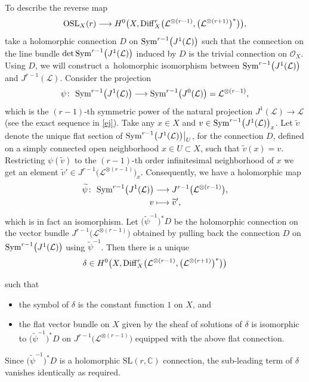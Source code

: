 \documentclass[pdftex]{sigma}
\numberwithin{equation}{section}
\begin{document}
To describe the reverse map
\begin{equation}\label{z1b}
{\rm OSL}_X(r) \longrightarrow H^0\bigl(X, {\rm Diff}^r_X
\bigl({\mathcal L}^{\otimes (r-1)}, \bigl({\mathcal L}^{\otimes (r+1)}\bigr)^*\bigr)\bigr),
\end{equation}
take a holomorphic connection $D$ on ${\rm Sym}^{r-1}\bigl(J^1(\mathcal
L)\bigr)$ such that the connection on the line bundle $\det {\rm Sym}^{r-1}\bigl(J^1(\mathcal L)\bigr)$ induced by $D$ is
the trivial connection on ${\mathcal O}_X$. Using $D$, we will construct a~holomorphic
isomorphism between ${\rm Sym}^{r-1}\bigl(J^1(\mathcal L)\bigr)$ and $J^{r-1}(\mathcal L)$. Consider
the projection
\[
\psi\colon\ {\rm Sym}^{r-1}\bigl(J^1(\mathcal L)\bigr) \longrightarrow {\rm Sym}^{r-1}\bigl(J^0(\mathcal L)\bigr) =
{\mathcal L}^{\otimes (r-1)},
\]
which is the $(r-1)$-th symmetric power of the natural projection $J^1(\mathcal L)
\longrightarrow \mathcal L$ (see the exact sequence in \eqref{ej}). Take any $x \in X$ and $v \in {\rm
Sym}^{r-1}\bigl(J^1(\mathcal L)\bigr)_x$. Let $\widetilde{v}$ denote the unique flat section of ${\rm
Sym}^{r-1}\bigl(J^1(\mathcal L)\bigr)\big\vert_U$, for the connection $D$, defined on a simply
connected open neighborhood $x \in U \subset X$, such that $\widetilde{v}(x) =
v$. Restricting $\psi(\widetilde{v})$ to the $(r-1)$-th order infinitesimal neighborhood of
$x$ we get an element $\widetilde{v}' \in J^{r-1}\bigl({\mathcal L}^{\otimes (r-1)}\bigr)_x$.
Consequently, we have a holomorphic map
\begin{align}
\widetilde{\psi}\colon\ {\rm Sym}^{r-1}\bigl(J^1(\mathcal L)\bigr) & \longrightarrow J^{r-1}\bigl({\mathcal L}^{\otimes (r-1)}\bigr),\nonumber\\
v& \longmapsto \widetilde{v}',\label{psn}
\end{align}
which is in fact an isomorphism. Let $\bigl(\widetilde{\psi}^{-1}\bigr)^*D$
be the holomorphic connection on the vector bundle $J^{r-1}\bigl({\mathcal L}^{\otimes (r-1)}\bigr)$ obtained by pulling
back the connection $D$ on ${\rm Sym}^{r-1}\bigl(J^1(\mathcal L)\bigr)$ using $\widetilde{\psi}^{-1}$.
Then there is a unique
\begin{equation}\label{a2}
\delta \in H^0\bigl(X, {\rm Diff}^r_X\bigl({\mathcal L}^{\otimes (r-1)},
\bigl({\mathcal L}^{\otimes (r+1)}\bigr)^*\bigr)\bigr)
\end{equation}
{\samepage such that
\begin{itemize}\itemsep=0pt
\item the symbol of $\delta$ is the constant function $1$ on $X$, and

\item the flat vector bundle on $X$ given by the sheaf of solutions of $\delta$ is isomorphic
to $\bigl(\widetilde{\psi}^{-1}\bigr)^*D$ on $J^{r-1}\bigl({\mathcal L}^{\otimes (r-1)}\bigr)$ equipped with the above
flat connection.
\end{itemize}}
Since $\bigl(\widetilde{\psi}^{-1}\bigr)^*D$ is a holomorphic $\text{SL}(r,{\mathbb C})$ connection, the
sub-leading term of $\delta$ vanishes identically as required.
\end{document}
